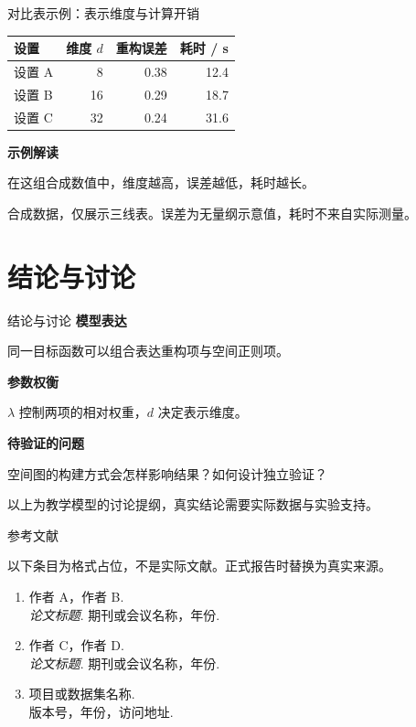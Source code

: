 \documentclass[aspectratio=169,11pt]{beamer}
\newcommand{\smallnote}[1]{\par{\scriptsize\color{Muted}#1\par}}
\newcommand{\labeltext}[1]{{\color{Teal}\bfseries #1}\par}
\begin{document}
\begin{frame}{对比表示例：表示维度与计算开销}
  \vspace{3mm}
  \begin{center}
    \renewcommand{\arraystretch}{1.55}
    \setlength{\tabcolsep}{7mm}
    \begin{tabular}{@{}lrrr@{}}
      \toprule
      \textbf{设置} & \textbf{维度 $d$} &
      \textbf{重构误差} & \textbf{耗时 / s}\\
      \midrule
      设置 A & 8  & 0.38 & 12.4\\
      设置 B & 16 & 0.29 & 18.7\\
      设置 C & 32 & 0.24 & 31.6\\
      \bottomrule
    \end{tabular}
  \end{center}
  \vspace{5mm}
  \labeltext{示例解读}
  在这组合成数值中，维度越高，误差越低，耗时越长。
  \vspace{5mm}
  \smallnote{合成数据，仅展示三线表。误差为无量纲示意值，耗时不来自实际测量。}
\end{frame}

\section{结论与讨论}
\begin{frame}{结论与讨论}
  \vspace{2mm}
  \labeltext{模型表达}
  \par
  同一目标函数可以组合表达重构项与空间正则项。
  \vspace{5mm}

  \labeltext{参数权衡}
  \par
  $\lambda$ 控制两项的相对权重，$d$ 决定表示维度。
  \vspace{5mm}

  \labeltext{待验证的问题}
  \par
  空间图的构建方式会怎样影响结果？如何设计独立验证？
  \vfill
  \smallnote{以上为教学模型的讨论提纲，真实结论需要实际数据与实验支持。}
\end{frame}

\begin{frame}{参考文献}
  \smallnote{以下条目为格式占位，不是实际文献。正式报告时替换为真实来源。}
  \vspace{6mm}
  \begin{enumerate}
    \setlength{\itemsep}{1.2em}
    \item 作者 A，作者 B.\\
      \textit{论文标题}. 期刊或会议名称，年份.
    \item 作者 C，作者 D.\\
      \textit{论文标题}. 期刊或会议名称，年份.
    \item 项目或数据集名称.\\
      版本号，年份，访问地址.
  \end{enumerate}
\end{frame}
\end{document}
